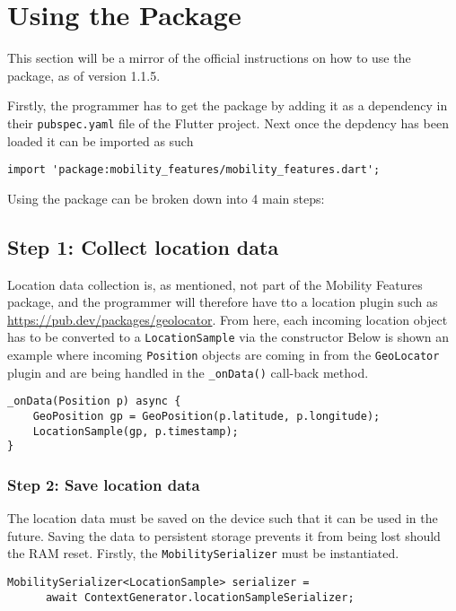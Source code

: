 \section{Using the Package}
This section will be a mirror of the official instructions on how to use the package, as of version 1.1.5.

Firstly, the programmer has to get the package by adding it as a dependency in their \verb|pubspec.yaml| file of the Flutter project. Next once the depdency has been loaded it can be imported as such

\begin{verbatim}
import 'package:mobility_features/mobility_features.dart';
\end{verbatim}

Using the package can be broken down into 4 main steps:

\subsection*{Step 1: Collect location data}
Location data collection is, as mentioned, not part of the Mobility Features package, and the programmer will therefore have tto a location plugin such as \url{https://pub.dev/packages/geolocator}. From here, each incoming location object has to be converted to a \verb|LocationSample| via the constructor
Below is shown an example where incoming \verb|Position| objects are coming in from the \verb|GeoLocator| plugin and are being handled in the \verb|_onData()| call-back method.

\begin{verbatim}
_onData(Position p) async {
    GeoPosition gp = GeoPosition(p.latitude, p.longitude);
    LocationSample(gp, p.timestamp);
}
\end{verbatim}

\subsubsection*{Step 2: Save location data}
The location data must be saved on the device such that it can be used in the future. Saving the data to persistent storage prevents it from being lost should the RAM reset. Firstly, the \verb|MobilitySerializer| must be instantiated.

\begin{verbatim}
MobilitySerializer<LocationSample> serializer =
      await ContextGenerator.locationSampleSerializer;
\end{verbatim}



